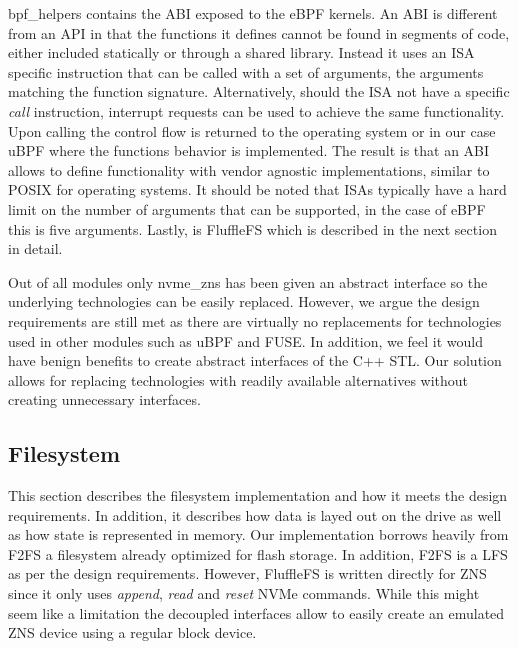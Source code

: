 bpf\_helpers contains the ABI exposed to the eBPF kernels. An ABI is different
from an API in that the functions it defines cannot be found in segments of
code, either included statically or through a shared library. Instead it uses
an ISA specific instruction that can be called with a set of arguments, the
arguments matching the function signature. Alternatively, should the ISA not
have a specific \textit{call} instruction, interrupt requests can be used to
achieve the same functionality. Upon calling the control flow is returned to
the operating system or in our case uBPF where the functions behavior is
implemented. The result is that an ABI allows to define functionality with
vendor agnostic implementations, similar to POSIX for operating systems. It
should be noted that ISAs typically have a hard limit on the number of arguments
that can be supported, in the case of eBPF this is five arguments. Lastly, is
FluffleFS which is described in the next section in detail.

Out of all modules only nvme\_zns has been given an abstract interface so the
underlying technologies can be easily replaced. However, we argue the design
requirements are still met as there are virtually no replacements for
technologies used in other modules such as uBPF and FUSE\footnotemark[12].
In addition, we feel it would have benign benefits to create abstract
interfaces of the C++ STL. Our solution allows for replacing technologies with
readily available alternatives without creating unnecessary interfaces.


\subsection{Filesystem}

This section describes the filesystem implementation and how it meets the design
requirements. In addition, it describes how data is layed out on the drive as
well as how state is represented in memory. Our implementation borrows heavily
from F2FS \cite{Lee2015F2FSAN} a filesystem already optimized for flash storage.
In addition, F2FS is a LFS as per the design requirements. However, FluffleFS is
written directly for ZNS since it only uses \textit{append}, \textit{read} and
\textit{reset} NVMe commands. While this might seem like a limitation the
decoupled interfaces allow to easily create an emulated ZNS device using a
regular block device.

